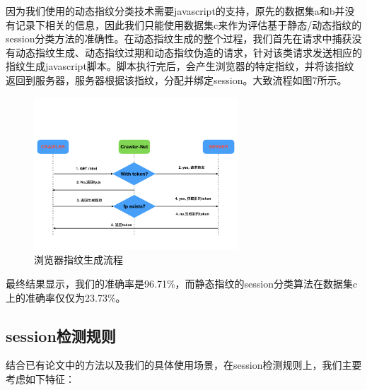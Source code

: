 \documentclass[doctor,privacy,twoside]{buaa_mac}
\begin{document}
因为我们使用的动态指纹分类技术需要javascript的支持，原先的数据集a和b并没有记录下相关的信息，因此我们只能使用数据集c来作为评估基于静态/动态指纹的session分类方法的准确性。在动态指纹生成的整个过程，我们首先在请求中捕获没有动态指纹生成、动态指纹过期和动态指纹伪造的请求，针对该类请求发送相应的指纹生成javascript脚本。脚本执行完后，会产生浏览器的特定指纹，并将该指纹返回到服务器，服务器根据该指纹，分配并绑定session。大致流程如图7所示。


\begin{figure}[!h]
  \centering
  \includegraphics[width=0.68\textwidth]{images/fingerprint_generation.png}
  \caption{浏览器指纹生成流程}
  \label{fig:logo}
\end{figure}
\centerline{}

最终结果显示，我们的准确率是96.71\%，而静态指纹的session分类算法在数据集c上的准确率仅仅为23.73\%。


\subsection{session检测规则}

结合已有论文中的方法以及我们的具体使用场景，在session检测规则上，我们主要考虑如下特征：
\end{document}
